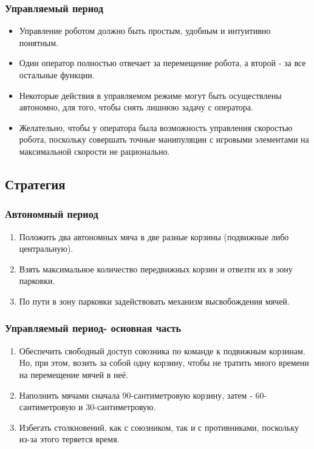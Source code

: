 \subsubsection{Управляемый период}
\begin{itemize}
	\item Управление роботом должно быть простым, удобным и интуитивно понятным.
	\item Один оператор полностью отвечает за перемещение робота, а второй - за все остальные функции.
	\item Некоторые действия в управляемом режиме могут быть осуществлены автономно, для того, чтобы снять лишнюю задачу с оператора.
	\item Желательно, чтобы у оператора была возможность управления скоростью робота, поскольку совершать точные манипуляции с игровыми элементами на максимальной скорости не рационально.
\end{itemize}
\fillpage

\subsection{Стратегия} 
\subsubsection{Автономный период}
\begin{enumerate}
    \item Положить два автономных мяча в две разные корзины (подвижные либо центральную).
	\item Взять максимальное количество передвижных корзин и отвезти их в зону парковки.
	\item По пути в зону парковки  задействовать механизм высвобождения мячей.
	         
\end{enumerate}
\subsubsection{Управляемый период-  основная часть}
\begin{enumerate}
	\item Обеспечить свободный доступ союзника по команде к подвижным корзинам. Но, при этом, возить за собой одну корзину, чтобы не тратить много времени на перемещение мячей в неё.
	\item Наполнить мячами сначала 90-сантиметровую корзину, затем - 60-сантиметровую и 30-сантиметровую.
	\item Избегать столкновений, как с союзником, так и с противниками, поскольку из-за этого теряется время.
\end{enumerate}
